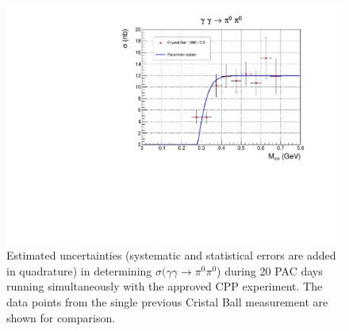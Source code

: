 \begin{figure}[tpb]
\centering
\includegraphics[page=4,width=4.75in]{figures/sigma_2pi0_figs.pdf}
\caption{Estimated uncertainties (systematic and statistical errors are added in quadrature) in determining $\sigma(\gamma\gamma\rightarrow\pi^0\pi^0$) during 20 PAC days running simultaneously with the approved CPP experiment. The data points from the single previous Cristal Ball measurement \cite{Marsiske:1990hx} are shown for comparison.
\label{fig:sigma_2pi0_figs_4}}
\end{figure}





